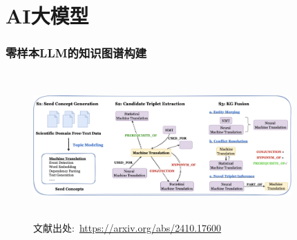 %
%
%

\appendix
\section{\rm{AI}大模型}
\begin{frame}
	\frametitle{零样本\textrm{LLM}的知识图谱构建}
\begin{figure}[h!]
\centering
\vskip -8pt
\includegraphics[height=2.2in,width=3.90in,viewport=0 0 215 90,clip]{Figures/KG_Chem-KG-LLM.png}
\caption{\tiny\textrm{文献出处:~\url{https://arxiv.org/abs/2410.17600}}}%
\label{Fig:KG_Chem-LLM_KG}
\end{figure}
\end{frame}


